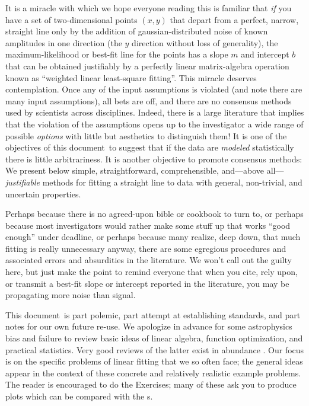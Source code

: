 \documentclass[12pt,twoside]{article}
\newcommand{\documentname}{document}
\newcommand{\problemname}{Exercise}
\newcounter{problem}
\begin{document}
It is a miracle with which we hope everyone reading this is familiar
that \emph{if} you have a set of two-dimensional points $(x,y)$ that
depart from a perfect, narrow, straight line only by the addition of
gaussian-distributed noise of known amplitudes in one direction (the
$y$ direction without loss of generality), the maximum-likelihood or
best-fit line for the points has a slope $m$ and intercept $b$ that
can be obtained justifiably by a perfectly linear matrix-algebra
operation known as ``weighted linear least-square fitting''.  This
miracle deserves contemplation.  Once any of the input assumptions is
violated (and note there are many input assumptions), all bets are
off, and there are no consensus methods used by scientists across
disciplines.  Indeed, there is a large literature that implies that
the violation of the assumptions opens up to the investigator a wide
range of possible \emph{options} with little but aesthetics to
distinguish them!  It is one of the objectives of this
\documentname\ to suggest that if the data are \emph{modeled}
statistically there is little arbitrariness.  It is another objective
to promote consensus methods: We present below simple,
straightforward, comprehensible, and---above all---\emph{justifiable}
methods for fitting a straight line to data with general, non-trivial,
and uncertain properties.

Perhaps because there is no agreed-upon bible or cookbook to turn to,
or perhaps because most investigators would rather make some stuff up
that works ``good enough'' under deadline, or perhaps because many
realize, deep down, that much fitting is really unnecessary anyway,
there are some egregious procedures and associated errors and
absurdities in the literature.  We won't call out the guilty here, but
just make the point to remind everyone that when you cite, rely upon,
or transmit a best-fit slope or intercept reported in the literature,
you may be propagating more noise than signal.

This \documentname\ is part polemic, part attempt at establishing standards,
and part notes for our own future re-use.  We apologize in advance for
some astrophysics bias and failure to review basic ideas of linear
algebra, function optimization, and practical statistics.  Very good
reviews of the latter exist in abundance \citep{jaynes,mackay,press}.
Our focus is on the specific problems of linear fitting that we so
often face; the general ideas appear in the context of these concrete
and relatively realistic example problems.  The reader is encouraged
to do the \problemname s; many of these ask you to produce plots which
can be compared with the \figurename s.
\end{document}
